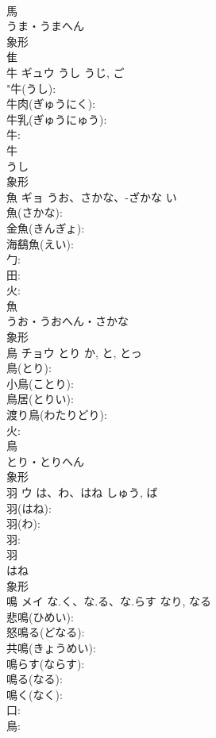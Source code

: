 \documentclass[8pt]{extreport}
\begin{document}
\begin{CJK}{UTF8}{min}
\\	馬	
\\	うま・うまへん	
\\	象形 
\\	隹 
\\	牛	ギュウ	うし	うじ, ご	
\\	"牛(うし): 
\\	牛肉(ぎゅうにく): 
\\	牛乳(ぎゅうにゅう): 
\\	牛: 
\\	牛	
\\	うし	
\\	象形 
\\	魚	ギョ	うお、さかな、-ざかな	い	
\\	魚(さかな): 
\\	金魚(きんぎょ): 
\\	海鷂魚(えい): 
\\	勹: 
\\	田: 
\\	火: 
\\	魚	
\\	うお・うおへん・さかな	
\\	象形 
\\	鳥	チョウ	とり	か, と, とっ	
\\	鳥(とり): 
\\	小鳥(ことり): 
\\	鳥居(とりい): 
\\	渡り鳥(わたりどり): 
\\	火: 
\\	鳥	
\\	とり・とりへん	
\\	象形 
\\	羽	ウ	は、わ、はね	しゅう, ば	
\\	羽(はね): 
\\	羽(わ): 
\\	羽: 
\\	羽	
\\	はね	
\\	象形 
\\	鳴	メイ	な.く、な.る、な.らす	なり, なる	
\\	悲鳴(ひめい): 
\\	怒鳴る(どなる): 
\\	共鳴(きょうめい): 
\\	鳴らす(ならす): 
\\	鳴る(なる): 
\\	鳴く(なく): 
\\	口: 
\\	鳥: 

\end{CJK}
\end{document}

